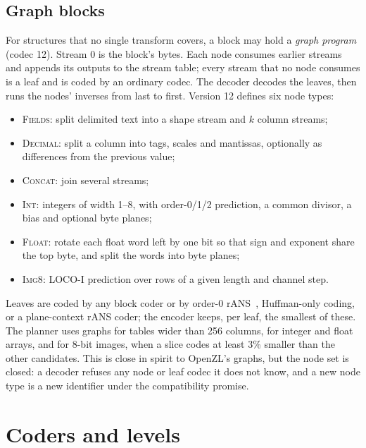 \documentclass[conference]{IEEEtran}
\begin{document}
\subsection{Graph blocks}\label{sec:graph}
For structures that no single transform covers, a block may hold a \emph{graph program} (codec 12). Stream 0 is the
block's bytes. Each node consumes earlier streams and appends its outputs to the stream table; every stream that no
node consumes is a leaf and is coded by an ordinary codec. The decoder decodes the leaves, then runs the nodes'
inverses from last to first. Version 12 defines six node types:
\begin{itemize}
\item \textsc{Fields}: split delimited text into a shape stream and $k$ column streams;
\item \textsc{Decimal}: split a column into tags, scales and mantissas, optionally as differences from the previous
value;
\item \textsc{Concat}: join several streams;
\item \textsc{Int}: integers of width 1--8, with order-0/1/2 prediction, a common divisor, a bias and optional byte
planes;
\item \textsc{Float}: rotate each float word left by one bit so that sign and exponent share the top byte, and
split the words into byte planes;
\item \textsc{Img8}: LOCO-I prediction over rows of a given length and channel step.
\end{itemize}
Leaves are coded by any block coder or by order-0 rANS~\cite{ans}, Huffman-only coding, or a plane-context rANS coder;
the encoder keeps, per leaf, the smallest of these. The planner uses graphs for tables wider than 256 columns, for
integer and float arrays, and for 8-bit images, when a slice codes at least 3\% smaller than the other candidates.
This is close in spirit to OpenZL's graphs, but the node set is closed: a decoder refuses any node or leaf codec it
does not know, and a new node type is a new identifier under the compatibility promise.

\section{Coders and levels}\label{sec:coders}\label{sec:levels}
\end{document}
